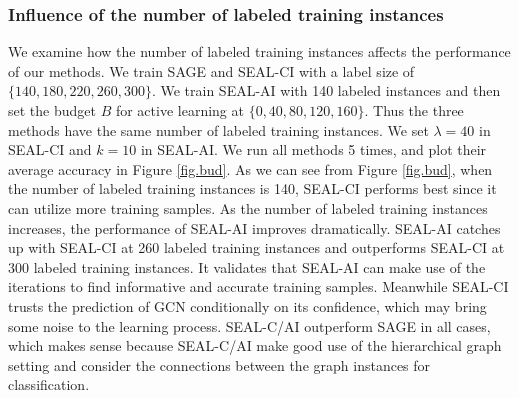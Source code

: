 \documentclass[sigconf]{acmart}
\newcommand{\eat}[1]{}
\begin{document}
\begin{table}
  \caption{Comparison of different methods on the synthetic data set for semi-supervised graph classification}
  \label{tab:synr}
\eat{\vspace{-0.4cm}}
\end{table}

\subsubsection{Influence of the number of labeled training instances}
We examine how the number of labeled training instances affects the performance of our methods.  We train SAGE and SEAL-CI with a label size of $\{140, 180, 220, 260, 300\}$.  We train SEAL-AI with 140 labeled instances and then set the budget $B$ for active learning at $\{0, 40, 80, 120, 160\}$.  Thus the three methods have the same number of labeled training instances.  We set $\lambda=40$ in SEAL-CI and $k=10$ in SEAL-AI.  We run all methods 5 times, and plot their average accuracy in Figure \ref{fig.bud}.  As we can see from Figure \ref{fig.bud}, when the number of labeled training instances is 140, SEAL-CI performs best since it can utilize more training samples.  As the number of labeled training instances increases, the performance of SEAL-AI improves dramatically.  SEAL-AI catches up with SEAL-CI at 260 labeled training instances and outperforms SEAL-CI at 300 labeled training instances.  It validates that SEAL-AI can make use of the iterations to find informative and accurate training samples.  Meanwhile SEAL-CI trusts the prediction of GCN conditionally on its confidence, which may bring some noise to the learning process.  SEAL-C/AI outperform SAGE in all cases, which makes sense because SEAL-C/AI make good use of the hierarchical graph setting and consider the connections between the graph instances for classification.
\end{document}

